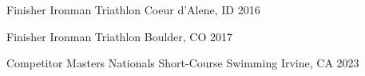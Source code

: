 



\begin{cvhonors}


\cvhonor
{Finisher} %
{Ironman Triathlon} %
{Coeur d'Alene, ID} %
{2016} %


\cvhonor
{Finisher} %
{Ironman Triathlon} %
{Boulder, CO} %
{2017} %


\cvhonor
{Competitor} %
{Masters Nationals Short-Course Swimming} %
{Irvine, CA} %
{2023} %


\end{cvhonors}
